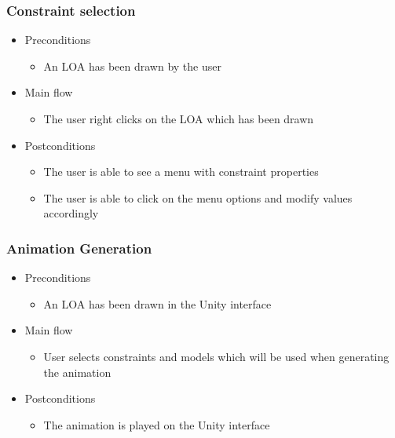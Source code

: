 \subsubsection{Constraint selection}
    \begin{itemize}
    \item Preconditions
        \begin{itemize}
            \item An LOA has been drawn by the user
        \end{itemize}
    \end{itemize}
    \begin{itemize}
        \item Main flow
        \begin{itemize}
            \item The user right clicks on the LOA which has been drawn
        \end{itemize}
    \end{itemize}
    \begin{itemize}
        \item Postconditions
        \begin{itemize}
            \item The user is able to see a menu with constraint properties
            \item The user is able to click on the menu options and modify values accordingly
        \end{itemize}
    \end{itemize}

\subsubsection{Animation Generation}
    \begin{itemize}
    \item Preconditions
        \begin{itemize}
            \item An LOA has been drawn in the Unity interface
        \end{itemize}
    \end{itemize}
    \begin{itemize}
        \item Main flow
        \begin{itemize}
            \item User selects constraints and models which will be used when generating the animation
        \end{itemize}
    \end{itemize}
    \begin{itemize}
        \item Postconditions
        \begin{itemize}
            \item The animation is played on the Unity interface
        \end{itemize}
    \end{itemize}

